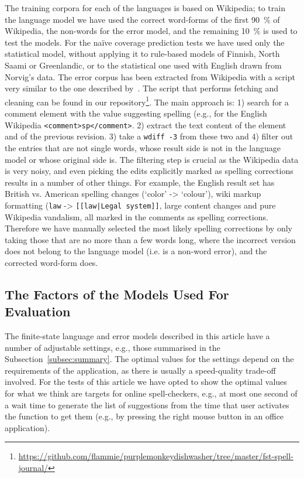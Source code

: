 \documentclass[a4paper,12pt]{article}
\begin{document}
The training corpora for each of the languages is based on Wikipedia; to train
the language model we have used the correct word-forms of the first 90~\% of
Wikipedia, the non-words for the error model, and the remaining 10~\% is used
to test the models. For the naïve coverage prediction tests we have used only
the statistical model, without applying it to rule-based models of Finnish, North
Saami or Greenlandic, or to the statistical one used with English drawn from
Norvig's data. The error corpus has been extracted from Wikipedia
with a script very similar to the one described by~\cite{max2010mining}. The
script that performs fetching and cleaning can be found in our
repository\footnote{\url{https://github.com/flammie/purplemonkeydishwasher/tree/master/fst-spell-journal/}}. The main approach is: 1) search for a comment
element with the value suggesting spelling (e.g., for the English Wikipedia
\texttt{<comment>sp</comment>}. 2) extract the text content of the element and
of the previous revision. 3) take a \texttt{wdiff -3} from these two and 4)
filter out the entries that are not single words, whose result side is not in
the language model or whose original side is. The filtering step is crucial
as the Wikipedia data is very noisy, and even picking the edits explicitly
marked as spelling corrections results in a number of other things. For example, the
English result set has British vs. American spelling changes (`color' ->
`colour'), wiki markup formatting (\texttt{law} -> \texttt{[[law|Legal
system]]}, large content changes and pure Wikipedia vandalism, all marked in
the comments as spelling corrections. Therefore we have manually selected the
most likely spelling corrections by only taking those that are no more than a
few words long, where the incorrect version does not belong to the language
model (i.e. is a non-word error), and the corrected word-form does.

\subsection{The Factors of the Models Used For Evaluation}
\label{subsec:factors}

The finite-state language and error models described in this article have a
number of adjustable settings, e.g., those summarised in the
Subsection~\ref{subsec:summary}. The optimal values for the settings depend on
the requirements of the application, as there is usually a speed-quality
trade-off involved. For the tests of this article we have opted to show the
optimal values for what we think are targets for online spell-checkers, e.g., at
most one second of a wait time to generate the list of suggestions from the
time that user activates the function to get them (e.g., by pressing the right
mouse button in an office application).
\end{document}
